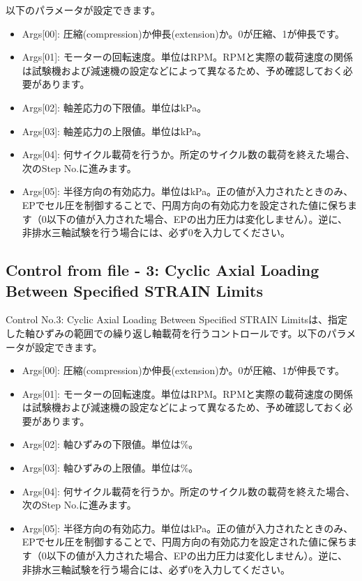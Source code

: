 以下のパラメータが設定できます。
\begin{itemize}
    \item Args[00]: 圧縮(compression)か伸長(extension)か。0が圧縮、1が伸長です。
    \item Args[01]: モーターの回転速度。単位はRPM。RPMと実際の載荷速度の関係は試験機および減速機の設定などによって異なるため、予め確認しておく必要があります。
    \item Args[02]: 軸差応力の下限値。単位はkPa。
    \item Args[03]: 軸差応力の上限値。単位はkPa。
    \item Args[04]: 何サイクル載荷を行うか。所定のサイクル数の載荷を終えた場合、次のStep No.に進みます。
    \item Args[05]: 半径方向の有効応力。単位はkPa。正の値が入力されたときのみ、EPでセル圧を制御することで、円周方向の有効応力を設定された値に保ちます（0以下の値が入力された場合、EPの出力圧力は変化しません）。逆に、非排水三軸試験を行う場合には、必ず0を入力してください。
\end{itemize}

\subsection{Control from file - 3: Cyclic Axial Loading Between Specified STRAIN Limits}
Control No.3: Cyclic Axial Loading Between Specified STRAIN Limitsは、指定した軸ひずみの範囲での繰り返し軸載荷を行うコントロールです。以下のパラメータが設定できます。
\begin{itemize}
    \item Args[00]: 圧縮(compression)か伸長(extension)か。0が圧縮、1が伸長です。
    \item Args[01]: モーターの回転速度。単位はRPM。RPMと実際の載荷速度の関係は試験機および減速機の設定などによって異なるため、予め確認しておく必要があります。
    \item Args[02]: 軸ひずみの下限値。単位は\%。
    \item Args[03]: 軸ひずみの上限値。単位は\%。
    \item Args[04]: 何サイクル載荷を行うか。所定のサイクル数の載荷を終えた場合、次のStep No.に進みます。
    \item Args[05]: 半径方向の有効応力。単位はkPa。正の値が入力されたときのみ、EPでセル圧を制御することで、円周方向の有効応力を設定された値に保ちます（0以下の値が入力された場合、EPの出力圧力は変化しません）。逆に、非排水三軸試験を行う場合には、必ず0を入力してください。
\end{itemize}

